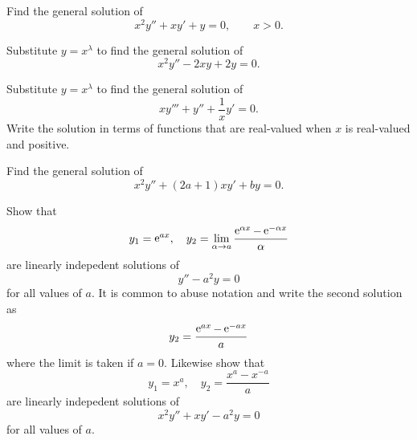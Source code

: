 {%
\begin{Exercise}
  \label{exercise x2y+xy+y}
  Find the general solution of
  \[
  x^2 y'' + x y' + y = 0, \qquad x > 0.
  \]

\end{Exercise}




\begin{Exercise}
  \label{exercise x2y-2xy+2y}
  Substitute $y = x^\lambda$ to find the general solution of
  \[
  x^2 y'' - 2 x y + 2 y = 0.
  \]

\end{Exercise}



\begin{Exercise}
  \label{exercise xy+y+1xy}
  Substitute $y = x^\lambda$ to find the general solution of
  \[ 
  x y''' + y'' + \frac{1}{x} y' = 0. 
  \]
  Write the solution in terms of functions that are real-valued when $x$ is
  real-valued and positive.

\end{Exercise}




\begin{Exercise}
  \label{exercise x2y+2a1xy+by}
  Find the general solution of 
  \[
  x^2 y'' + (2 a + 1) x y' + b y = 0.
  \]

\end{Exercise}



\begin{Exercise}
  \label{exercise y1=eax}
  Show that 
  \[
  y_1 = \mathop{\mathrm{e}}\nolimits^{a x}, \quad
  y_2 = \lim_{\alpha \to a} \frac{\mathop{\mathrm{e}}\nolimits^{\alpha x} - \mathop{\mathrm{e}}\nolimits^{-\alpha x}}{\alpha}
  \]
  are linearly indepedent solutions of 
  \[
  y'' - a^2 y = 0
  \]
  for all values of $a$.
  It is common to abuse notation and write the second solution as 
  \[
  y_2 = \frac{\mathop{\mathrm{e}}\nolimits^{a x} - \mathop{\mathrm{e}}\nolimits^{-a x}}{a}
  \]
  where the limit is taken if $a = 0$.
  Likewise show that
  \[
  y_1 = x^a, \quad
  y_2 = \frac{x^a - x^{-a}}{a}
  \]
  are linearly indepedent solutions of 
  \[
  x^2 y'' + x y' - a^2 y = 0
  \]
  for all values of $a$.


\end{Exercise}}
